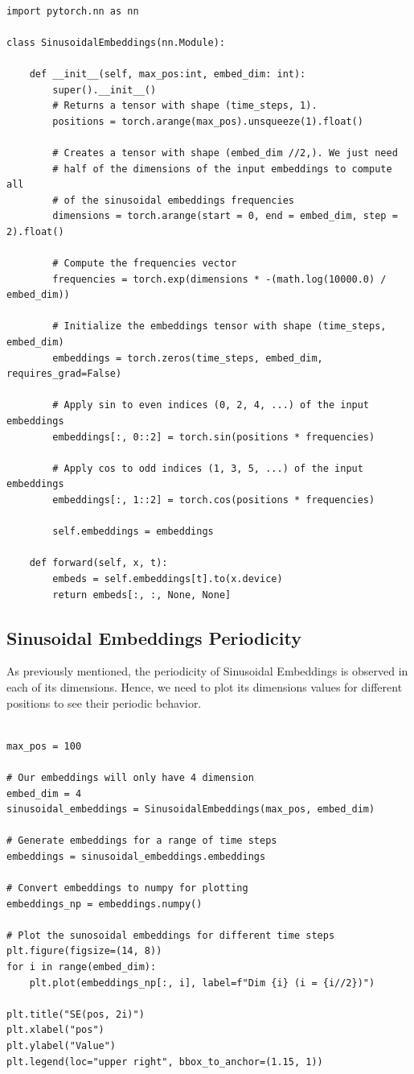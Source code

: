 \documentclass{article}
\begin{document}
\begin{lstlisting}[caption={Sinusoidal Embedding Module Definition}]
	
import pytorch.nn as nn
	
class SinusoidalEmbeddings(nn.Module):

	def __init__(self, max_pos:int, embed_dim: int):
		super().__init__()
		# Returns a tensor with shape (time_steps, 1).
		positions = torch.arange(max_pos).unsqueeze(1).float()
		
		# Creates a tensor with shape (embed_dim //2,). We just need 
		# half of the dimensions of the input embeddings to compute all
		# of the sinusoidal embeddings frequencies
		dimensions = torch.arange(start = 0, end = embed_dim, step = 2).float()
		
		# Compute the frequencies vector
		frequencies = torch.exp(dimensions * -(math.log(10000.0) / embed_dim))
		
		# Initialize the embeddings tensor with shape (time_steps, embed_dim)
		embeddings = torch.zeros(time_steps, embed_dim, requires_grad=False)
		
		# Apply sin to even indices (0, 2, 4, ...) of the input embeddings
		embeddings[:, 0::2] = torch.sin(positions * frequencies)
		
		# Apply cos to odd indices (1, 3, 5, ...) of the input embeddings
		embeddings[:, 1::2] = torch.cos(positions * frequencies)
		
		self.embeddings = embeddings
	
	def forward(self, x, t):
		embeds = self.embeddings[t].to(x.device)
		return embeds[:, :, None, None]

\end{lstlisting}

\subsection{Sinusoidal Embeddings Periodicity}

As previously mentioned, the periodicity of  Sinusoidal Embeddings is observed in each of its dimensions. Hence, we need to plot its dimensions values for different positions to see their periodic behavior. 

\begin{lstlisting}[caption={Generating the plot of the embedding's dimensions for in different positions}]
	
max_pos = 100

# Our embeddings will only have 4 dimension
embed_dim = 4
sinusoidal_embeddings = SinusoidalEmbeddings(max_pos, embed_dim)

# Generate embeddings for a range of time steps
embeddings = sinusoidal_embeddings.embeddings

# Convert embeddings to numpy for plotting
embeddings_np = embeddings.numpy()

# Plot the sunosoidal embeddings for different time steps
plt.figure(figsize=(14, 8))
for i in range(embed_dim):
	plt.plot(embeddings_np[:, i], label=f"Dim {i} (i = {i//2})")
	
plt.title("SE(pos, 2i)")
plt.xlabel("pos")
plt.ylabel("Value")
plt.legend(loc="upper right", bbox_to_anchor=(1.15, 1))
\end{lstlisting}
\end{document}
